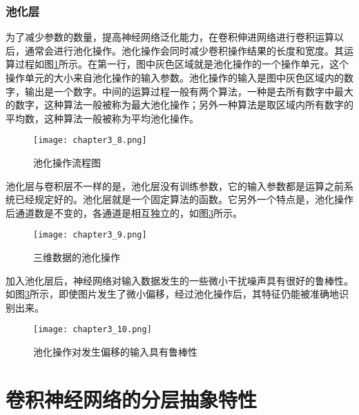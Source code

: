 \subsubsection{池化层}
为了减少参数的数量，提高神经网络泛化能力，在卷积伸进网络进行卷积运算以后，通常会进行池化操作。池化操作会同时减少卷积操作结果的长度和宽度。其运算过程如图\ref{fig:chapter3_8}所示。在第一行，图中灰色区域就是池化操作的一个操作单元，这个操作单元的大小来自池化操作的输入参数。池化操作的输入是图中灰色区域内的数字，输出是一个数字。中间的运算过程一般有两个算法，一种是去所有数字中最大的数字，这种算法一般被称为最大池化操作；另外一种算法是取区域内所有数字的平均数，这种算法一般被称为平均池化操作。
\begin{figure}
    \centering
    \texttt{[image: chapter3\_8.png]}
    \caption{池化操作流程图\cite{luyujie_214}}
    \label{fig:chapter3_8}
\end{figure}
池化层与卷积层不一样的是，池化层没有训练参数，它的输入参数都是运算之前系统已经规定好的。池化层就是一个固定算法的函数。它另外一个特点是，池化操作后通道数是不变的，各通道是相互独立的，如图\ref{fig:chapter3_10}所示。
\begin{figure}
    \centering
    \texttt{[image: chapter3\_9.png]}
    \caption{三维数据的池化操作\cite{luyujie_215}}
    \label{fig:chapter3_9}
\end{figure}
加入池化层后，神经网络对输入数据发生的一些微小干扰噪声具有很好的鲁棒性。如图\ref{fig:chapter3_10}所示，即使图片发生了微小偏移，经过池化操作后，其特征仍能被准确地识别出来。
\begin{figure}
    \centering
    \texttt{[image: chapter3\_10.png]}
    \caption{池化操作对发生偏移的输入具有鲁棒性\cite{luyujie_216}}
    \label{fig:chapter3_10}
\end{figure}
\section{卷积神经网络的分层抽象特性}
